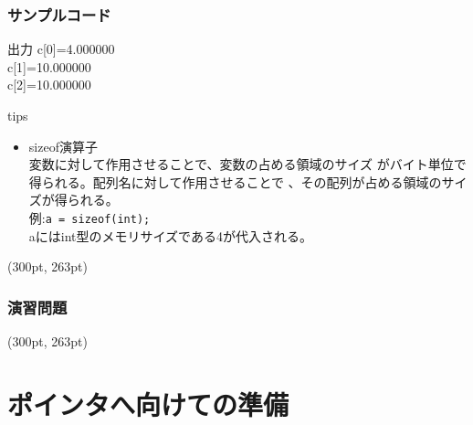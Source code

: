 \documentclass[dvipdfmx]{beamer}
\begin{document}
\begin{frame}[c, fragile, label=61]
    \frametitle{サンプルコード}
    \begin{block}{出力}
        c[0]=4.000000\\
        c[1]=10.000000\\
        c[2]=10.000000\\
    \end{block}
    \begin{itembox}[l]{tips}
        \begin{itemize}
            \item sizeof演算子\\
                 変数に対して作用させることで、変数の占める領域のサイズ
                 がバイト単位で得られる。配列名に対して作用させることで
                 、その配列が占める領域のサイズが得られる。\\
                 例:\space \texttt{a = sizeof(int);}\\
                 aにはint型のメモリサイズである4が代入される。
        \end{itemize}
    \end{itembox}
    \begin{textblock*}{0.3\linewidth}(300pt, 263pt)
        \hyperlink{60}{}
        \space
        \hyperlink{62}{}
    \end{textblock*}
\end{frame}

\begin{frame}[t, fragile, label=62]
    \frametitle{演習問題}
    \begin{textblock*}{0.3\linewidth}(300pt, 263pt)
        \hyperlink{61}{}
        \space
        \hyperlink{63}{}
    \end{textblock*}
\end{frame}

\section{ポインタへ向けての準備}
\end{document}

